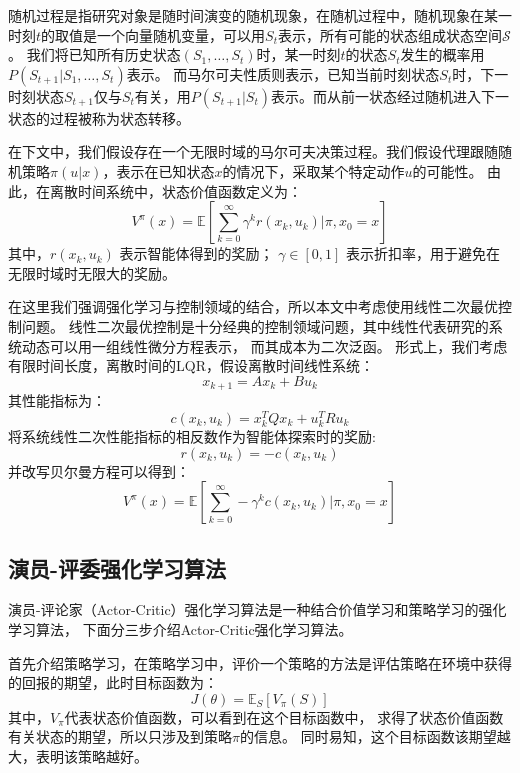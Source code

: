 \documentclass[AutoFakeBold]{LZUThesis}
\begin{document}
随机过程是指研究对象是随时间演变的随机现象，在随机过程中，随机现象在某一时刻$t$的取值是一个向量随机变量，可以用$S_t$表示，所有可能的状态组成状态空间$\mathcal{S}$。
我们将已知所有历史状态$( S_1,\dots,S_t )$时，某一时刻$t$的状态$S_t$发生的概率用$P( S_{t + 1} | S_1,\dots,S_t )$表示。
而马尔可夫性质则表示，已知当前时刻状态$S_t$时，下一时刻状态$S_{t + 1}$仅与$S_t$有关，用$P( S_{t + 1} | S_t)$表示。而从前一状态经过随机进入下一状态的过程被称为状态转移。

在下文中，我们假设存在一个无限时域的马尔可夫决策过程。我们假设代理跟随随机策略$\pi(u | x)$，表示在已知状态$x$的情况下，采取某个特定动作$u$的可能性。
由此，在离散时间系统中，状态价值函数定义为：
\begin{equation}
  V^{\pi}(x) = \mathbb{E} \left[ \sum_{k = 0}^{\infty} \gamma^k r(x_k, u_k) |
  \pi, x_0 = x \right]
\end{equation}
其中，$r(x_k, u_k)$ 表示智能体得到的奖励；
$\gamma \in [0, 1]$ 表示折扣率，用于避免在无限时域时无限大的奖励。

在这里我们强调强化学习与控制领域的结合，所以本文中考虑使用线性二次最优控制问题。
线性二次最优控制是十分经典的控制领域问题，其中线性代表研究的系统动态可以用一组线性微分方程表示，
而其成本为二次泛函。
形式上，我们考虑有限时间长度，离散时间的LQR，假设离散时间线性系统：
$$
x_{k + 1} = A x_k + B u_k
$$
其性能指标为：
\begin{equation}
  c(x_k, u_k) = x_k^T Q x_k + u_k^T R u_k
\end{equation}
将系统线性二次性能指标的相反数作为智能体探索时的奖励:
\begin{equation}
  r(x_k, u_k) = - c(x_k, u_k)
\end{equation}
并改写贝尔曼方程可以得到：
\begin{equation}
  V^{\pi}(x) = \mathbb{E} \left[ \sum_{k = 0}^{\infty} - \gamma^k c(x_k, u_k) | \pi, x_0 = x \right]
\end{equation}

\subsection{演员-评委强化学习算法}
演员-评论家（Actor-Critic）强化学习算法是一种结合价值学习和策略学习的强化学习算法，
下面分三步介绍Actor-Critic强化学习算法。

首先介绍策略学习，在策略学习中，评价一个策略的方法是评估策略在环境中获得的回报的期望，此时目标函数为：
\begin{equation}
  J(\theta) = \mathbb{E}_S\left[ V_\pi (S) \right]
\end{equation}
其中，$V_\pi$代表状态价值函数，可以看到在这个目标函数中，
求得了状态价值函数有关状态的期望，所以只涉及到策略$\pi$的信息。
同时易知，这个目标函数该期望越大，表明该策略越好。
\end{document}
